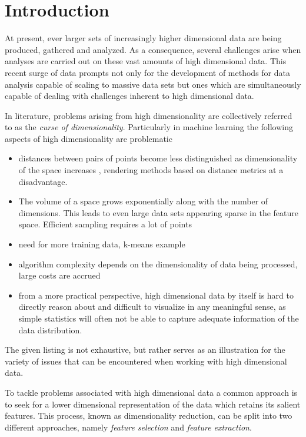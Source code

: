 \chapter{Introduction}
\label{ch:introduction}

At present, ever larger sets of increasingly higher dimensional data are being produced, gathered and analyzed. As a consequence, several challenges arise when analyses are carried out on these vast amounts of high dimensional data. This recent surge of data prompts not only for the development of methods for data analysis capable of scaling to massive data sets but ones which are simultaneously capable of dealing with challenges inherent to high dimensional data.

In literature, problems arising from high dimensionality are collectively referred to as the \textit{curse of dimensionality}. Particularly in machine learning the following aspects of high dimensionality are problematic

\begin{itemize}
\item distances between pairs of points become less distinguished as dimensionality of the space increases \cite{on_the_surprising_behavior_of_distance_metrics}, rendering methods based on distance metrics at a disadvantage.
\item The volume of a space grows exponentially along with the number of dimensions. This leads to even large data sets appearing sparse in the feature space. Efficient sampling requires a lot of points
\item need for more training data, k-means example \cite[p.~263]{understanding_machine_learning}
\item algorithm complexity depends on the dimensionality of data being processed, large costs are accrued
\item from a more practical perspective, high dimensional data by itself is hard to directly reason about and difficult to visualize in any meaningful sense, as simple statistics will often not be able to capture adequate information of the data distribution.
\end{itemize}

The given listing is not exhaustive, but rather serves as an illustration for the variety of issues that can be encountered when working with high dimensional data.

To tackle problems associated with high dimensional data a common approach is to seek for a lower dimensional representation of the data which retains its salient features. This process, known as dimensionality reduction, can be split into two different approaches, namely \textit{feature selection} and \textit{feature extraction}.

